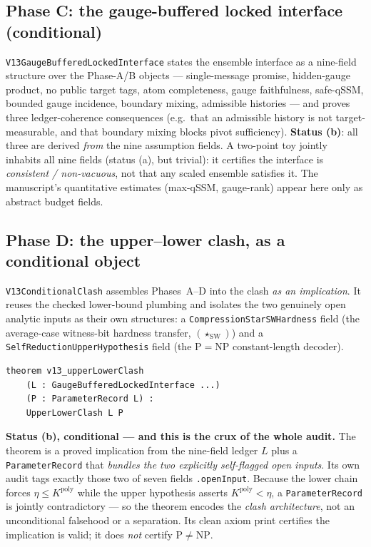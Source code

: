 \documentclass[11pt]{article}
\theoremstyle{definition}
\newcommand{\Kpoly}{K^{\mathrm{poly}}}
\newcommand{\StarSW}{(\star_{\mathrm{SW}})}
\begin{document}
\subsection{Phase C: the gauge-buffered locked interface (conditional)}
\texttt{V13GaugeBufferedLockedInterface} states the ensemble interface as a
nine-field structure over the Phase-A/B objects --- single-message promise,
hidden-gauge product, no public target tags, atom completeness, gauge
faithfulness, safe-qSSM, bounded gauge incidence, boundary mixing, admissible
histories --- and proves three ledger-coherence consequences (e.g.\ that an
admissible history is not target-measurable, and that boundary mixing blocks pivot
sufficiency). \textbf{Status (b)}: all three are derived \emph{from} the nine
assumption fields. A two-point toy jointly inhabits all nine fields (status (a),
but trivial): it certifies the interface is \emph{consistent / non-vacuous}, not
that any scaled ensemble satisfies it. The manuscript's quantitative estimates
(max-qSSM, gauge-rank) appear here only as abstract budget fields.

\subsection{Phase D: the upper--lower clash, as a conditional object}
\label{sec:phaseD}
\texttt{V13ConditionalClash} assembles Phases~A--D into the clash \emph{as an
implication}. It reuses the checked lower-bound plumbing and isolates the two
genuinely open analytic inputs as their own structures: a
\texttt{CompressionStarSWHardness} field (the average-case witness-bit hardness
transfer, $\StarSW$) and a \texttt{SelfReductionUpperHypothesis} field (the
$\mathrm{P}=\mathrm{NP}$ constant-length decoder).
\begin{lstlisting}
theorem v13_upperLowerClash
    (L : GaugeBufferedLockedInterface ...)
    (P : ParameterRecord L) :
    UpperLowerClash L P
\end{lstlisting}
\textbf{Status (b), conditional --- and this is the crux of the whole audit.} The
theorem is a proved implication from the nine-field ledger $L$ plus a
\texttt{ParameterRecord} that \emph{bundles the two explicitly self-flagged open
inputs}. Its own audit tags exactly those two of seven fields \texttt{.openInput}.
Because the lower chain forces $\eta\le\Kpoly$ while the upper hypothesis asserts
$\Kpoly<\eta$, a \texttt{ParameterRecord} is jointly contradictory --- so the
theorem encodes the \emph{clash architecture}, not an unconditional falsehood or a
separation. Its clean axiom print certifies the implication is valid; it does
\emph{not} certify $\mathrm{P}\neq\mathrm{NP}$.
\end{document}
